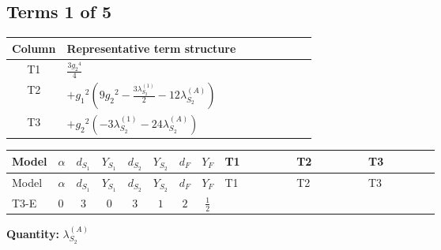 \documentclass[8pt]{article}
\begin{document}
\begin{landscape}
\subsection*{Terms 1 of 5}
\begin{center}
\begin{tabular}{@{}c >{\raggedright\arraybackslash}p{0.82\linewidth}@{}}
\toprule
Column & Representative term structure \\
\midrule
T1 & \(\displaystyle \frac{3 {g_2}^4}{4}\) \\
\midrule
T2 & \(\displaystyle +{g_1}^2 \left(9 {g_2}^2-\frac{3 {\lambda_{S_2}^{(1)}}}{2}-12 {\lambda_{S_2}^{(A)}}\right)\) \\
\midrule
T3 & \(\displaystyle +{g_2}^2 (-3 {\lambda_{S_2}^{(1)}}-24 {\lambda_{S_2}^{(A)}})\) \\
\midrule
\bottomrule
\end{tabular}
\end{center}
\smallskip
\tiny
\begin{longtable}{@{}llcccccc >{\raggedright\arraybackslash}p{0.21\linewidth} >{\raggedright\arraybackslash}p{0.21\linewidth} >{\raggedright\arraybackslash}p{0.21\linewidth}@{}}
\toprule
Model & $\alpha$ & $d_{S_1}$ & $Y_{S_1}$ & $d_{S_2}$ & $Y_{S_2}$ & $d_F$ & $Y_F$ & T1 & T2 & T3 \\
\midrule
\endfirsthead
\toprule
Model & $\alpha$ & $d_{S_1}$ & $Y_{S_1}$ & $d_{S_2}$ & $Y_{S_2}$ & $d_F$ & $Y_F$ & T1 & T2 & T3 \\
\midrule
\endhead
T3-E & $0$ & $3$ & $0$ & $3$ & $1$ & $2$ & $\frac{1}{2}$ & \scriptsize\adjustbox{max width=\linewidth}{$\begin{gathered} \frac{3 {g_2}^4}{4}\end{gathered}$} & \scriptsize\adjustbox{max width=\linewidth}{$\begin{gathered} +{g_1}^2 \left(9 {g_2}^2-\frac{3 {\lambda_{S_2}^{(1)}}}{2}-12 {\lambda_{S_2}^{(A)}}\right)\end{gathered}$} & \scriptsize\adjustbox{max width=\linewidth}{$\begin{gathered} +{g_2}^2 (-3 {\lambda_{S_2}^{(1)}}-24 {\lambda_{S_2}^{(A)}})\end{gathered}$} \\
\midrule
\bottomrule
\end{longtable}
\clearpage
\noindent\textbf{Quantity: }$\lambda_{S_2}^{(A)}$\par\smallskip

\end{landscape}
\end{document}
